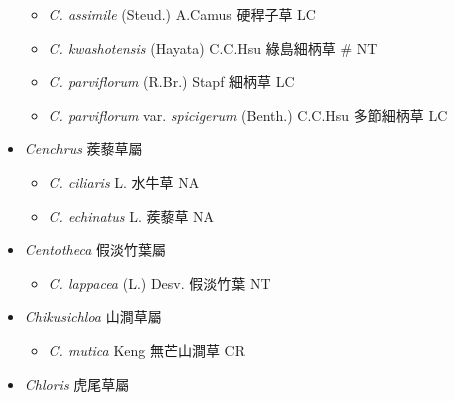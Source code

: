 \begin{itemize}
  \begin{itemize}
        \item[] \textit{C. assimile} (Steud.) A.Camus  硬稈子草   LC
        \item[] \textit{C. kwashotensis} (Hayata) C.C.Hsu  綠島細柄草  \# NT
        \item[] \textit{C. parviflorum} (R.Br.) Stapf  細柄草   LC
        \item[] \textit{C. parviflorum} var. \textit{spicigerum} (Benth.) C.C.Hsu  多節細柄草   LC
  \end{itemize}
 \item[] \textit{Cenchrus} 蒺藜草屬
                                
  \begin{itemize}
        \item[] \textit{C. ciliaris} L.  水牛草   NA
        \item[] \textit{C. echinatus} L.  蒺藜草   NA
  \end{itemize}
 \item[] \textit{Centotheca} 假淡竹葉屬
                                
  \begin{itemize}
        \item[] \textit{C. lappacea} (L.) Desv.  假淡竹葉   NT
  \end{itemize}
 \item[] \textit{Chikusichloa} 山澗草屬
                                
  \begin{itemize}
        \item[] \textit{C. mutica} Keng  無芒山澗草   CR
  \end{itemize}
 \item[] \textit{Chloris} 虎尾草屬
                                

\end{itemize}
